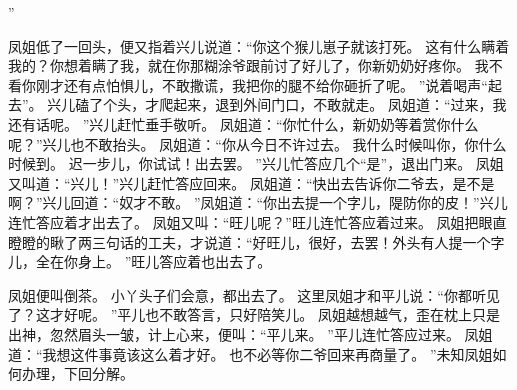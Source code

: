 ”\par
凤姐低了一回头，便又指着兴儿说道：“你这个猴儿崽子就该打死。
这有什么瞒着我的？你想着瞒了我，就在你那糊涂爷跟前讨了好儿了，你新奶奶好疼你。
我不看你刚才还有点怕惧儿，不敢撒谎，我把你的腿不给你砸折了呢。
”说着喝声“起去”。
兴儿磕了个头，才爬起来，退到外间门口，不敢就走。
凤姐道：“过来，我还有话呢。
”兴儿赶忙垂手敬听。
凤姐道：“你忙什么，新奶奶等着赏你什么呢？”兴儿也不敢抬头。
凤姐道：“你从今日不许过去。
我什么时候叫你，你什么时候到。
迟一步儿，你试试！出去罢。
”兴儿忙答应几个“是”，退出门来。
凤姐又叫道：“兴儿！”兴儿赶忙答应回来。
凤姐道：“快出去告诉你二爷去，是不是啊？”兴儿回道：“奴才不敢。
”凤姐道：“你出去提一个字儿，隄防你的皮！”兴儿连忙答应着才出去了。
凤姐又叫：“旺儿呢？”旺儿连忙答应着过来。
凤姐把眼直瞪瞪的瞅了两三句话的工夫，才说道：“好旺儿，很好，去罢！外头有人提一个字儿，全在你身上。
”旺儿答应着也出去了。
\par
凤姐便叫倒茶。
小丫头子们会意，都出去了。
这里凤姐才和平儿说：“你都听见了？这才好呢。
”平儿也不敢答言，只好陪笑儿。
凤姐越想越气，歪在枕上只是出神，忽然眉头一皱，计上心来，便叫：“平儿来。
”平儿连忙答应过来。
凤姐道：“我想这件事竟该这么着才好。
也不必等你二爷回来再商量了。
”未知凤姐如何办理，下回分解。
